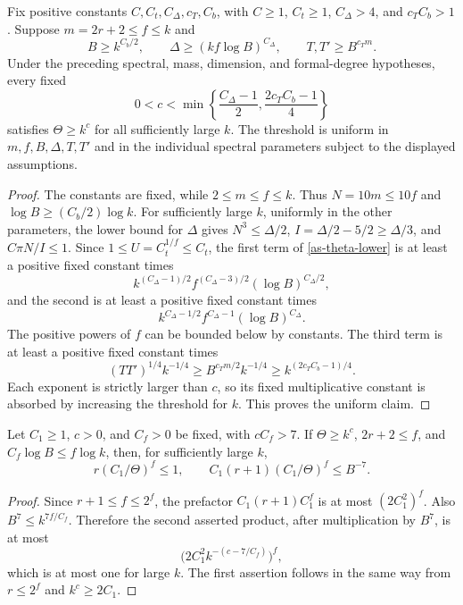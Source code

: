 \begin{corollary}\label{as-power-scale}
Fix positive constants $C,C_t,C_\Delta,c_T,C_b$, with
$C\geq1$, $C_t\geq1$, $C_\Delta>4$, and $c_TC_b>1$.
Suppose $m=2r+2\leq f\leq k$ and
\begin{equation}\label{as-growing-parameters}
 B\geq k^{C_b/2},\qquad
 \Delta\geq(kf\log B)^{C_\Delta},\qquad
 T,T'\geq B^{c_Tm}.
\end{equation}
Under the preceding spectral, mass, dimension, and
formal-degree hypotheses, every fixed
\begin{equation}\label{as-improved-exponent}
 0<c<\min\left\{\frac{C_\Delta-1}{2},
                         \frac{2c_TC_b-1}{4}\right\}
\end{equation}
satisfies $\Theta\geq k^c$ for all sufficiently large $k$.
The threshold is uniform in $m,f,B,\Delta,T,T'$ and in the
individual spectral parameters subject to the displayed
assumptions.
\end{corollary}

\begin{proof}
The constants are fixed, while $2\leq m\leq f\leq k$.
Thus $N=10m\leq10f$ and
$\log B\geq(C_b/2)\log k$.
For sufficiently large $k$, uniformly in the other parameters,
the lower bound for $\Delta$ gives
$N^3\leq\Delta/2$, $I=\Delta/2-5/2\geq\Delta/3$,
and $C\pi N/I\leq1$.
Since $1\leq U=C_t^{1/f}\leq C_t$, the first term of
\eqref{as-theta-lower} is at least a positive fixed constant times
\[
 k^{(C_\Delta-1)/2}
       f^{(C_\Delta-3)/2}(\log B)^{C_\Delta/2},
\]
and the second is at least a positive fixed constant times
\[
 k^{C_\Delta-1/2}
       f^{C_\Delta-1}(\log B)^{C_\Delta}.
\]
The positive powers of $f$ can be bounded below by constants.
The third term is at least a positive fixed constant times
\[
 (TT')^{1/4}k^{-1/4}
    \geq B^{c_Tm/2}k^{-1/4}
    \geq k^{(2c_TC_b-1)/4}.
\]
Each exponent is strictly larger than $c$, so its fixed
multiplicative constant is absorbed by increasing the threshold
for $k$.  This proves the uniform claim.
\end{proof}

\begin{corollary}\label{as-final-smallness}
Let $C_1\geq1$, $c>0$, and $C_f>0$ be fixed, with $cC_f>7$.
If $\Theta\geq k^c$, $2r+2\leq f$, and
$C_f\log B\leq f\log k$, then, for sufficiently large $k$,
\[
 r(C_1/\Theta)^f\leq1,\qquad
 C_1(r+1)(C_1/\Theta)^f\leq B^{-7}.
\]
\end{corollary}

\begin{proof}
Since $r+1\leq f\leq2^f$, the prefactor
$C_1(r+1)C_1^f$ is at most $(2C_1^2)^f$.
Also $B^7\leq k^{7f/C_f}$.
Therefore the second asserted product, after multiplication
by $B^7$, is at most
\[
 \bigl(2C_1^2k^{-(c-7/C_f)}\bigr)^f,
\]
which is at most one for large $k$.
The first assertion follows in the same way from
$r\leq2^f$ and $k^c\geq2C_1$.
\end{proof}

